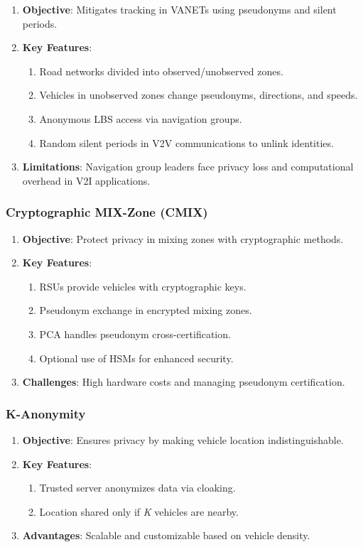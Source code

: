 \begin{enumerate}
    \item \textbf{Objective}: Mitigates tracking in VANETs using pseudonyms and silent periods.
    \item \textbf{Key Features}:
    \begin{enumerate}
        \item Road networks divided into observed/unobserved zones.
        \item Vehicles in unobserved zones change pseudonyms, directions, and speeds.
        \item Anonymous LBS access via navigation groups.
        \item Random silent periods in V2V communications to unlink identities.
    \end{enumerate}
    \item \textbf{Limitations}: Navigation group leaders face privacy loss and computational overhead in V2I applications.
\end{enumerate}

\subsubsection{Cryptographic MIX-Zone (CMIX)}
\begin{enumerate}
    \item \textbf{Objective}: Protect privacy in mixing zones with cryptographic methods.
    \item \textbf{Key Features}:
    \begin{enumerate}
        \item RSUs provide vehicles with cryptographic keys.
        \item Pseudonym exchange in encrypted mixing zones.
        \item PCA handles pseudonym cross-certification.
        \item Optional use of HSMs for enhanced security.
    \end{enumerate}
    \item \textbf{Challenges}: High hardware costs and managing pseudonym certification.
\end{enumerate}

\subsubsection{K-Anonymity}
\begin{enumerate}
    \item \textbf{Objective}: Ensures privacy by making vehicle location indistinguishable.
    \item \textbf{Key Features}:
    \begin{enumerate}
        \item Trusted server anonymizes data via cloaking.
        \item Location shared only if \emph{K} vehicles are nearby.
    \end{enumerate}
    \item \textbf{Advantages}: Scalable and customizable based on vehicle density.
\end{enumerate}

